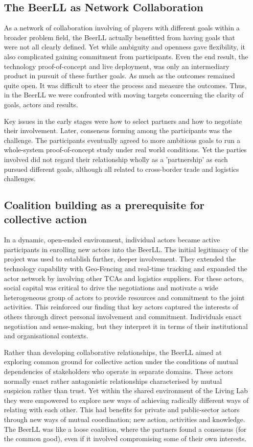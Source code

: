 \documentclass[graybox]{styles/svmult}
\begin{document}
\subsection{The BeerLL as Network Collaboration}
As a network of collaboration involving of players with different goals within a broader problem field, the BeerLL actually benefitted from having goals that were not all clearly defined. Yet while ambiguity and openness gave flexibility, it also complicated gaining commitment from participants. Even the end result, the technology proof-of-concept and live deployment, was only an intermediary product in pursuit of these further goals. As much as the outcomes remained quite open. It was difficult to steer the process and measure the outcomes. Thus, in the BeerLL we were confronted with moving targets concerning the clarity of goals, actors and results.

Key issues in the early stages were how to select partners and how to negotiate their involvement. 
Later, consensus forming among the participants was the challenge. The participants eventually agreed to more ambitious goals to run a whole-system proof-of-concept study under real world conditions. Yet the parties involved did not regard their relationship wholly as a 'partnership' as each pursued different goals, although all related to cross-border trade and logistics challenges.


\subsection{Coalition building as a prerequisite for collective action}

In a dynamic, open-ended environment, individual actors became active participants in enrolling new actors into the BeerLL. The initial legitimacy of the project was used to establish further, deeper involvement. They extended the technology capability with Geo-Fencing and real-time tracking and expanded the actor network by involving other TCAs and logistics suppliers. For these actors, social capital was critical to drive the negotiations and motivate a wide heterogeneous group of actors to provide resources and commitment to the joint activities. This reinforced our  finding that key actors captured the interests of others through direct personal involvement and commitment. Individuals enact negotiation and sense-making, but they interpret it in terms of their institutional and organisational contexts.

Rather than developing collaborative relationships, the BeerLL aimed at exploring common ground for collective action under the conditions of mutual dependencies of stakeholders who operate in separate domains. These actors normally enact rather antagonistic relationships characterised by mutual suspicion rather than trust. Yet within the shared environment of the Living Lab they were empowered to explore new ways of achieving radically different ways of relating with each other. This had benefits for private and public-sector actors through new ways of mutual coordination; new action, activities and knowledge. The BeerLL was like a loose coalition, where the partners found a consensus (for the common good), even if it involved compromising some of their own interests.
\end{document}
